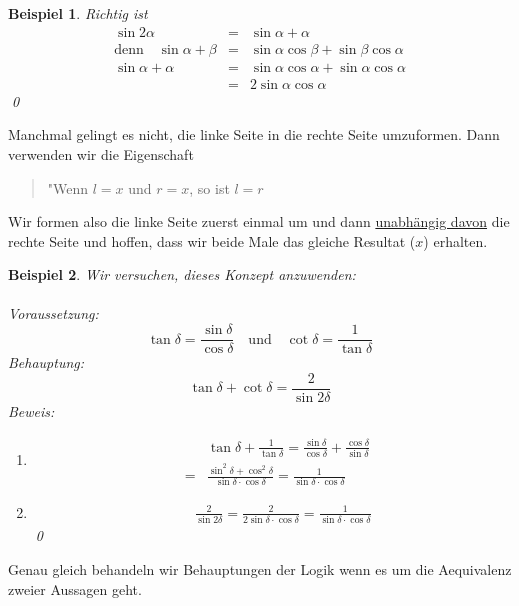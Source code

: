\documentclass{report}
\newtheorem{myexample}{Beispiel}
\begin{document}
\begin{myexample}Richtig ist
\begin{eqnarray}\sin{2\alpha} &=& \sin{\alpha + \alpha} \nonumber \\
\mbox{denn}\quad \sin{\alpha + \beta} &=& \sin{\alpha}\cos{\beta}+\sin{\beta}\cos{\alpha}\nonumber \\
\sin{\alpha + \alpha} &=& \sin{\alpha}\cos{\alpha}+\sin{\alpha}\cos{\alpha} \nonumber \\
&=& 2\sin{\alpha}\cos{\alpha}\end{eqnarray} \qed\end{myexample}
Manchmal gelingt es nicht, die linke Seite in die rechte Seite umzuformen. Dann verwenden wir die Eigenschaft
\begin{quote}"Wenn $l=x$ und $r=x$, so ist $l=r$\end{quote}
Wir formen also die linke Seite zuerst einmal um und dann \underline{unabhängig davon} die rechte Seite und hoffen, dass wir beide Male das gleiche Resultat ($x$) erhalten.
\begin{myexample}Wir versuchen, dieses Konzept anzuwenden:\\\\
Voraussetzung: \begin{equation}\tan{\delta} = \frac{\sin{\delta}}{\cos{\delta}} \quad\mbox{und}\quad\cot{\delta} = \frac{1}{\tan{\delta}}\end{equation}
Behauptung: \begin{equation}\tan{\delta} + \cot{\delta} = \frac{2}{\sin{2\delta}}\end{equation}
Beweis: \begin{enumerate}
\item \begin{eqnarray}& &\tan{\delta} + \frac{1}{\tan{\delta}}
=\frac{\sin{\delta}}{\cos{\delta}} + \frac{\cos{\delta}}{\sin{\delta}} \nonumber \\
&=&\frac{\sin^2{\delta} + \cos^2{\delta}}{\sin{\delta} \cdot \cos{\delta}} 
=\frac{1}{\sin{\delta} \cdot \cos{\delta}}\end{eqnarray}
\item \begin{eqnarray}& &\frac{2}{\sin{2\delta}} = \frac{2}{2\sin{\delta} \cdot \cos{\delta}}
=\frac{1}{\sin{\delta} \cdot \cos{\delta}}\end{eqnarray}\qed
\end{enumerate}\end{myexample}
Genau gleich behandeln wir Behauptungen der Logik wenn es um die Aequivalenz zweier Aussagen geht.
\end{document}
